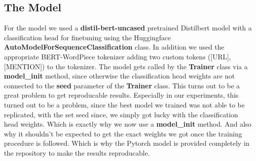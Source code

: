 \documentclass[11pt,a4paper]{article}
\begin{document}
\subsection{The Model}
For the model we used a \textbf{distil-bert-uncased} pretrained Distilbert model with a classification head for finetuning
using the Huggingface \textbf{AutoModelForSequenceClassification} class. In addition we used the appropriate BERT-WordPiece 
tokenizer adding two custom tokens ([URL],[MENTION]) to the tokenizer.
The model gets called by the \textbf{Trainer} class via a \textbf{model\_init} method, since otherwise the classification head
weights are not connected to the \textbf{seed} parameter of the \textbf{Trainer} class.
This turns out to be a great problem to get reproducable results.
Especially in our experiments, this turned out to be a problem, since the best model we trained was not able to be replicated,
with the set seed since, we simply got lucky with the classification head weights. Which is exactly why we now use a \textbf{model\_init} method.
And also why it shouldn't be expected to get the exact weights we got once the training procedure is followed.
Which is why the Pytorch model is provided completely in the repository to make the results reproducable.
\end{document}
